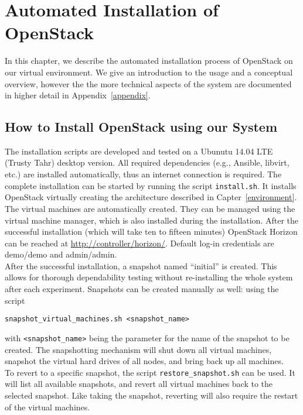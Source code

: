 \section[Automated Installation of OpenStack \texorpdfstring{{\textbf{\tiny \enspace (SK, NK)}}}{}]{Automated Installation of OpenStack}
\label{installing}

In this chapter, we describe the automated installation process of OpenStack on our virtual environment. We give an introduction to the usage and a conceptual overview, however the the more technical aspects of the system are documented in higher detail in Appendix~\ref{appendix}.

\subsection{How to Install OpenStack using our System}
The installation scripts are developed and tested on a Ubunutu 14.04 LTE (Trusty Tahr) desktop version. All required dependencies (e.g., Ansible, libvirt, etc.) are installed automatically, thus an internet connection is required. The complete installation can be started by running the script \verb|install.sh|. It installs OpenStack virtually creating the architecture described in Capter~\ref{environment}. The virtual machines are automatically created. They can be managed using the virtual machine manager, which is also installed during the installation. After the successful installation (which will take ten to fifteen minutes) OpenStack Horizon can be reached at \url{http://controller/horizon/}. Default log-in credentials are demo/demo and admin/admin.\\

After the successful installation, a snapshot named ``initial'' is created. This allows for thorough dependability testing without re-installing the whole system after each experiment. Snapshots can be created manually as well: using the script 
\begin{verbatim}
snapshot_virtual_machines.sh <snapshot_name> 
\end{verbatim}
with \verb|<snapshot_name>| being the parameter for the name of the snapshot to be created. The snapshotting mechanism will shut down all virtual machines, snapshot the virtual hard drives of all nodes, and bring back up all machines.\\

To revert to a specific snapshot, the script \verb|restore_snapshot.sh| can be used. It will list all available snapshots, and revert all virtual machines back to the selected snapshot. Like taking the snapshot, reverting will also require the restart of the virtual machines.

